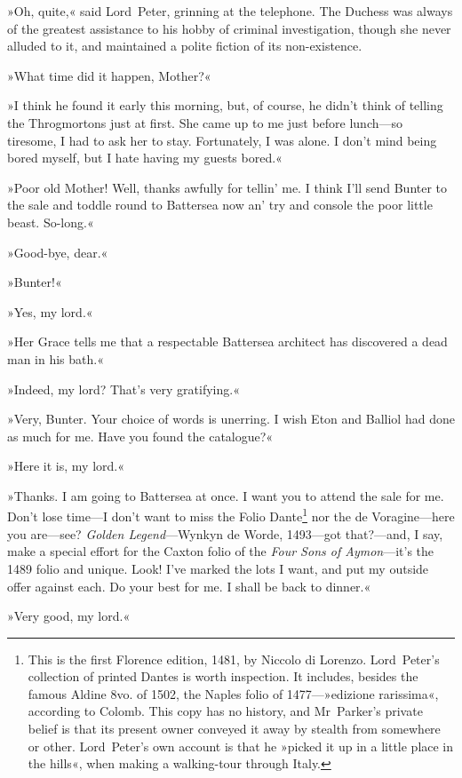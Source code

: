 »Oh, quite,« said Lord~Peter, grinning at the telephone. The Duchess was always of the greatest assistance to his hobby of criminal investigation, though she never alluded to it, and maintained a polite fiction of its non-existence.

»What time did it happen, Mother?«

»I think he found it early this morning, but, of course, he didn't think of telling the Throgmortons just at first. She came up to me just before lunch—so tiresome, I had to ask her to stay. Fortunately, I was alone. I don't mind being bored myself, but I hate having my guests bored.«

»Poor old Mother! Well, thanks awfully for tellin' me. I think I'll send Bunter to the sale and toddle round to Battersea now an' try and console the poor little beast. So-long.«

»Good-bye, dear.«

»Bunter!«

»Yes, my lord.«

»Her Grace tells me that a respectable Battersea architect has discovered a dead man in his bath.«

»Indeed, my lord? That's very gratifying.«

»Very, Bunter. Your choice of words is unerring. I wish Eton and Balliol had done as much for me. Have you found the catalogue?«

»Here it is, my lord.«

»Thanks. I am going to Battersea at once. I want you to attend the sale for me. Don't lose time—I don't want to miss the Folio Dante\footnote{This is the first Florence edition, 1481, by Niccolo di Lorenzo. Lord~Peter's collection of printed Dantes is worth inspection. It includes, besides the famous Aldine 8vo. of 1502, the Naples folio of 1477—»edizione rarissima«, according to Colomb. This copy has no history, and Mr~Parker's private belief is that its present owner conveyed it away by stealth from somewhere or other. Lord~Peter's own account is that he »picked it up in a little place in the hills«, when making a walking-tour through Italy.} nor the de Voragine—here you are—see? \textit{Golden Legend}---Wynkyn de Worde, 1493—got that?---and, I say, make a special effort for the Caxton folio of the \textit{Four Sons of Aymon}---it's the 1489 folio and unique. Look! I've marked the lots I want, and put my outside offer against each. Do your best for me. I shall be back to dinner.«

»Very good, my lord.«

